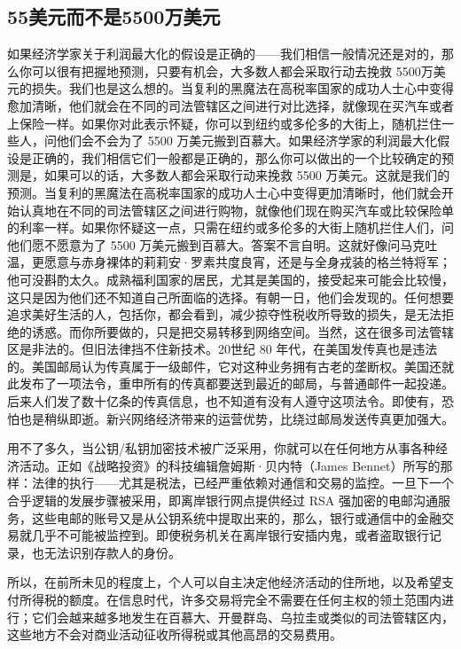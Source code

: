 \subsection{55美元而不是5500万美元}
如果经济学家关于利润最大化的假设是正确的——我们相信一般情况还是对的，那么你可以很有把握地预测，只要有机会，大多数人都会采取行动去挽救 5500万美元的损失。我们也是这么想的。当复利的黑魔法在高税率国家的成功人士心中变得愈加清晰，他们就会在不同的司法管辖区之间进行对比选择，就像现在买汽车或者上保险一样。如果你对此表示怀疑，你可以到纽约或多伦多的大街上，随机拦住一些人，问他们会不会为了 5500 万美元搬到百慕大。如果经济学家的利润最大化假设是正确的，我们相信它们一般都是正确的，那么你可以做出的一个比较确定的预测是，如果可以的话，大多数人都会采取行动来挽救 5500 万美元。这就是我们的预测。当复利的黑魔法在高税率国家的成功人士心中变得更加清晰时，他们就会开始认真地在不同的司法管辖区之间进行购物，就像他们现在购买汽车或比较保险单的利率一样。如果你怀疑这一点，只需在纽约或多伦多的大街上随机拦住人们，问他们愿不愿意为了 5500 万美元搬到百慕大。答案不言自明。这就好像问马克吐温，更愿意与赤身裸体的莉莉安·罗素共度良宵，还是与全身戎装的格兰特将军；他可没斟酌太久。成熟福利国家的居民，尤其是美国的，接受起来可能会比较慢，这只是因为他们还不知道自己所面临的选择。有朝一日，他们会发现的。任何想要追求美好生活的人，包括你，都会看到，减少掠夺性税收所导致的损失，是无法拒绝的诱惑。而你所要做的，只是把交易转移到网络空间。当然，这在很多司法管辖区是非法的。但旧法律挡不住新技术。20世纪 80 年代，在美国发传真也是违法的。美国邮局认为传真属于一级邮件，它对这种业务拥有古老的垄断权。美国还就此发布了一项法令，重申所有的传真都要送到最近的邮局，与普通邮件一起投递。后来人们发了数十亿条的传真信息，也不知道有没有人遵守这项法令。即使有，恐怕也是稍纵即逝。新兴网络经济带来的运营优势，比绕过邮局发送传真更加强大。

用不了多久，当公钥/私钥加密技术被广泛采用，你就可以在任何地方从事各种经济活动。正如《战略投资》的科技编辑詹姆斯·贝内特（James Bennet）所写的那样：法律的执行——尤其是税法，已经严重依赖对通信和交易的监控。一旦下一个合乎逻辑的发展步骤被采用，即离岸银行网点提供经过 RSA 强加密的电邮沟通服务，这些电邮的账号又是从公钥系统中提取出来的，那么，银行或通信中的金融交易就几乎不可能被监控到。即使税务机关在离岸银行安插内鬼，或者盗取银行记录，也无法识别存款人的身份。

所以，在前所未见的程度上，个人可以自主决定他经济活动的住所地，以及希望支付所得税的额度。在信息时代，许多交易将完全不需要在任何主权的领土范围内进行；它们会越来越多地发生在百慕大、开曼群岛、乌拉圭或类似的司法管辖区内，这些地方不会对商业活动征收所得税或其他高昂的交易费用。

